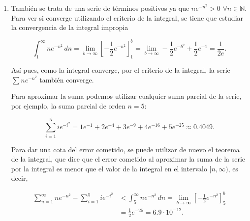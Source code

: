 \documentclass[
  spanish,
  a4paper,
]{scrreport}
\theoremstyle{definition}
\theoremstyle{remark}
\begin{document}
\begin{tcolorbox}
\begin{enumerate}
  \[
  \int_2^\infty \frac{1}{x\ln(x)}\,dx = \lim_{b\to\infty}\left[\ln(\ln(x))\right]_2^b = \lim_{b\to\infty} \ln(\ln(b))-\ln(\ln(2)) = \infty.
  \]

  Así pues, como la integral diverge, por el criterio de la integral, la
  serie \(\sum \frac{1}{n\ln(n)}\) también diverge.
\item
  También se trata de una serie de términos positivos ya que
  \(ne^{-n^2}>0\) \(\forall n\in\mathbb{N}\). Para ver si converge
  utilizando el criterio de la integral, se tiene que estudiar la
  convergencia de la integral impropia

  \[
  \int_1^\infty ne^{-n^2}\,dn = \lim_{b\to\infty}\left[-\frac{1}{2}e^{-n^2}\right]_1^b = \lim_{b\to\infty} -\frac{1}{2}e^{-b^2}+\frac{1}{2}e^{-1} = \frac{1}{2e}.
  \]

  Así pues, como la integral converge, por el criterio de la integral,
  la serie \(\sum ne^{-n^2}\) también converge.

  Para aproximar la suma podemos utilizar cualquier suma parcial de la
  serie, por ejemplo, la suma parcial de orden \(n=5\):

  \[
  \sum_{i=1}^5 ie^{-i^2} = 1e^{-1}+2e^{-4}+3e^{-9}+4e^{-16}+5e^{-25} \approx 0.4049.
  \]

  Para dar una cota del error cometido, se puede utilizar de nuevo el
  teorema de la integral, que dice que el error cometido al aproximar la
  suma de la serie por la integral es menor que el valor de la integral
  en el intervalo \([n,\infty)\), es decir,

  \begin{align*}
  \sum_{n=1}^\infty ne^{-n^2} - \sum_{i=1}^5 ie^{-i^2}
  &< \int_5^\infty ne^{-n^2}\,dn 
  = \lim_{b\to\infty}\left[-\frac{1}{2}e^{-n^2}\right]_5^b \\
  &= \frac{1}{2}e^{-25} = 6.9 \cdot 10^{-12}.
  \end{align*}
\end{enumerate}

\end{tcolorbox}
\end{document}
